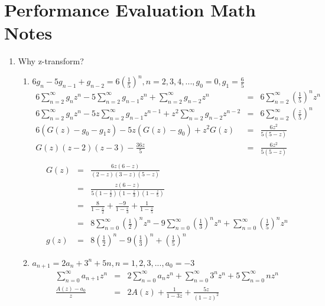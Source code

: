 \documentclass[12pt]{article}
\begin{document}
\section*{Performance Evaluation Math Notes}
  \begin{enumerate}
    \item Why z-transform?
      \begin{enumerate}
        \item $6g_{n} - 5g_{n-1} + g_{n-2} = 6(\frac{1}{5})^n, n = 2, 3, 4, ..., g_{0} = 0, g_{1} = \frac{6}{5}$
          \begin{eqnarray*}
            6\sum_{n=2}^{\infty}{g_{n}z^{n}} - 5\sum_{n=2}^{\infty}{g_{n-1}z^{n}} + \sum_{n=2}^{\infty}{g_{n-2}z^{n}} &=& 6\sum_{n=2}^{\infty}{(\frac{1}{5})^{n}z^{n}} \\
            6\sum_{n=2}^{\infty}{g_{n}z^{n}} - 5z\sum_{n=2}^{\infty}{g_{n-1}z^{n-1}} + z^2\sum_{n=2}^{\infty}{g_{n-2}z^{n-2}} &=& 6\sum_{n=2}^{\infty}{(\frac{z}{5})^{n}} \\
            6(G(z) - g_{0} - g_{1}z) - 5z(G(z) - g_{0}) + z^2G(z) &=& \frac{6z^2}{5(5-z)} \\
            G(z)(z - 2)(z - 3) - \frac{36z}{5} &=& \frac{6z^2}{5(5-z)} \\
          \end{eqnarray*}
          \begin{eqnarray*}
            G(z) &=& \frac{6z(6 - z)}{(2 - z)(3 - z)(5 - z)} \\
                 &=& \frac{z(6 - z)}{5(1 - \frac{z}{2})(1 - \frac{z}{3})(1 - \frac{z}{5})} \\
                 &=& \frac{8}{1 - \frac{z}{2}} + \frac{-9}{1 - \frac{z}{3}} + \frac{1}{1 - \frac{z}{5}} \\
                 &=& 8\sum_{n=0}^{\infty}(\frac{1}{2})^nz^n - 9\sum_{n=0}^{\infty}(\frac{1}{3})^nz^n + \sum_{n=0}^{\infty}(\frac{1}{5})^nz^n \\
            g(z) &=& 8(\frac{1}{2})^n - 9(\frac{1}{3})^n + (\frac{1}{5})^n
          \end{eqnarray*}
        \item $a_{n+1} = 2a_{n} + 3^n + 5n, n = 1, 2, 3, ..., a_{0} = -3$
          \begin{eqnarray*}
            \sum_{n=0}^{\infty}{a_{n+1}z^{n}} &=& 2\sum_{n=0}^{\infty}{a_{n}z^{n}} + \sum_{n=0}^{\infty}3^{n}z^{n} + 5\sum_{n=0}^{\infty}{nz^{n}} \\
            \frac{A(z) - a_{0}}{z} &=& 2A(z) + \frac{1}{1 - 3z} + \frac{5z}{(1 - z)^2} \\

\end{eqnarray*}
\end{enumerate}
\end{enumerate}
\end{document}
